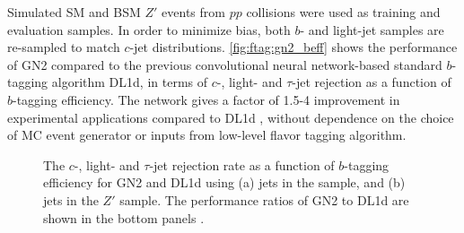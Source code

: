 \documentclass[../thesis.tex]{subfiles}
\begin{document}
Simulated \acs{SM} \ttbar and \acs{BSM} $Z'$ events from $pp$ collisions were used as training and evaluation samples. In order to minimize bias, both $b$- and light-jet samples are re-sampled to match $c$-jet distributions. \autoref{fig:ftag:gn2_beff} shows the performance of GN2 compared to the previous convolutional neural network-based standard $b$-tagging algorithm DL1d, in terms of $c$-, light- and $\tau$-jet rejection as a function of $b$-tagging efficiency. The network gives a factor of 1.5-4 improvement in experimental applications compared to DL1d \citep{ftag:gn2}, without dependence on the choice of MC event generator or inputs from low-level flavor tagging algorithm.

\begin{figure}[!htp]
\centering
{}
\caption[The $c$-, light- and $\tau$-jet rejection rate as a function of $b$-tagging efficiency for GN2 and DL1d using (a) jets in the \ttbar sample, and (b) jets in the $Z'$ sample. The performance ratios of GN2 to DL1d are shown in the bottom panels.]{\label{fig:ftag:gn2_beff}The $c$-, light- and $\tau$-jet rejection rate as a function of $b$-tagging efficiency for GN2 and DL1d using (a) jets in the \ttbar sample, and (b) jets in the $Z'$ sample. The performance ratios of GN2 to DL1d are shown in the bottom panels \citep{ftag:gn2}.}
\end{figure}
\end{document}
